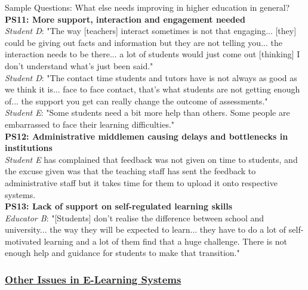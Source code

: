 Sample Questions: What else needs improving in higher education in general?
\vspace{0.25cm}\\
\textbf{PS11: More support, interaction and engagement needed}\\
\textit{Student D}: "The way [teachers] interact sometimes is not that engaging... [they] could be 
giving out facts and information but they are not telling you... the interaction needs to be 
there... a lot of students would just come out [thinking] I don't understand what's just been said."\\
\textit{Student D}: "The contact time students and tutors have is not always as good as we think it is...
face to face contact, that's what students are not getting enough of... the support you get can really 
change the outcome of assessments."\\
\textit{Student E}: "Some students need a bit more help than others. Some people are embarrassed to 
face their learning difficulties."
\vspace{0.25cm}\\
\textbf{PS12: Administrative middlemen causing delays and bottlenecks in institutions}\\
\textit{Student E} has complained that feedback was not given on time to students, and the excuse 
given was that the teaching staff has sent the feedback to administrative staff but it takes time for 
them to upload it onto respective systems.
\vspace{0.25cm}\\
\textbf{PS13: Lack of support on self-regulated learning skills}\\
\textit{Educator B}: "[Students] don't realise the difference between school and university... the way 
they will be expected to learn... they have to do a lot of self-motivated learning and a lot of them 
find that a huge challenge. There is not enough help and guidance for students to make that transition."

\subsubsection{\underline{Other Issues in E-Learning Systems}}

